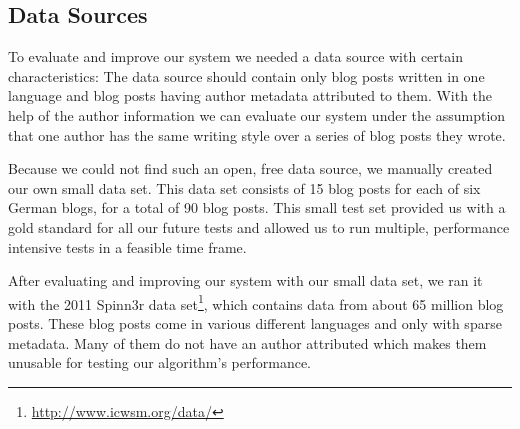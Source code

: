 
\subsection{Data Sources}
\label{sec:data_sources}


To evaluate and improve our system we needed a data source with certain characteristics:
The data source should contain only blog posts written in one language and blog posts having author metadata attributed to them.
With the help of the author information we can evaluate our system under the assumption that one author has the same writing style over a series of blog posts they wrote.

Because we could not find such an open, free data source, we manually created our own small data set.
This data set consists of 15 blog posts for each of six German blogs, for a total of 90 blog posts.
This small test set provided us with a gold standard for all our future tests and allowed us to run multiple, performance intensive tests in a feasible time frame.

After evaluating and improving our system with our small data set, we ran it with the 2011 Spinn3r data set\footnote{\url{http://www.icwsm.org/data/}}, which contains data from about 65 million blog posts.
These blog posts come in various different languages and only with sparse metadata.
Many of them do not have an author attributed which makes them unusable for testing our algorithm's performance.



